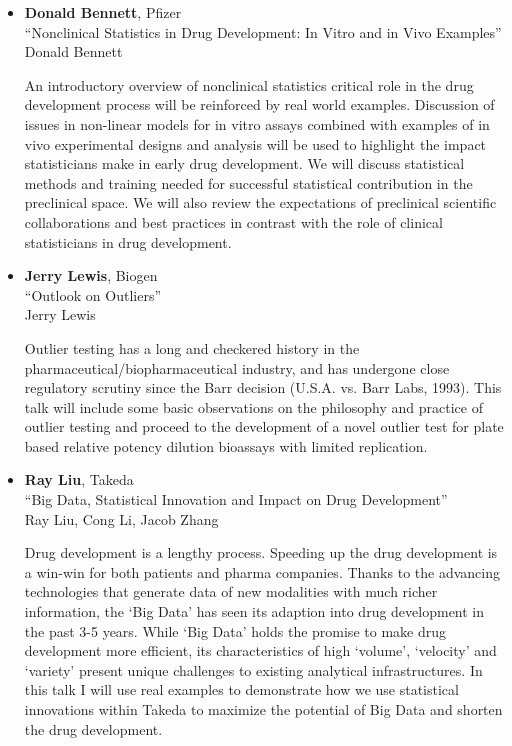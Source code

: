 \begin{itemize}
\item \textbf{Donald Bennett}, Pfizer \\
``Nonclinical Statistics in Drug Development: In Vitro and in Vivo Examples'' \\
Donald Bennett


An introductory overview of nonclinical statistics critical role in the drug development process will be reinforced by real world examples.  Discussion of issues in non-linear models for in vitro assays combined with examples of in vivo experimental designs and analysis will be used to highlight the impact statisticians make in early drug development.  We will discuss statistical methods and training needed for successful statistical contribution in the preclinical space.  We will also review the expectations of preclinical scientific collaborations and best practices in contrast with the role of clinical statisticians in drug development.

\item \textbf{Jerry Lewis}, Biogen \\
``Outlook on Outliers'' \\
Jerry Lewis


Outlier testing has a long and checkered history in the pharmaceutical/biopharmaceutical industry, and has undergone close regulatory scrutiny since the Barr decision (U.S.A. vs. Barr Labs, 1993).  This talk will include some basic observations on the philosophy and practice of outlier testing and proceed to the development of a novel outlier test for plate based relative potency dilution bioassays with limited replication.

\item \textbf{Ray Liu}, Takeda \\
``Big Data, Statistical Innovation and Impact on Drug Development'' \\
Ray Liu, Cong Li, Jacob Zhang


Drug development is a lengthy process. Speeding up the drug development is a win-win for both patients and pharma companies. Thanks to the advancing technologies that generate data of new modalities with much richer information, the ‘Big Data’ has seen its adaption into drug development in the past 3-5 years. While ‘Big Data’ holds the promise to make drug development more efficient, its characteristics of high ‘volume’, ‘velocity’ and ‘variety’ present unique challenges to existing analytical infrastructures. In this talk I will use real examples to demonstrate how we use statistical innovations within Takeda to maximize the potential of Big Data and shorten the drug development.


\end{itemize}
